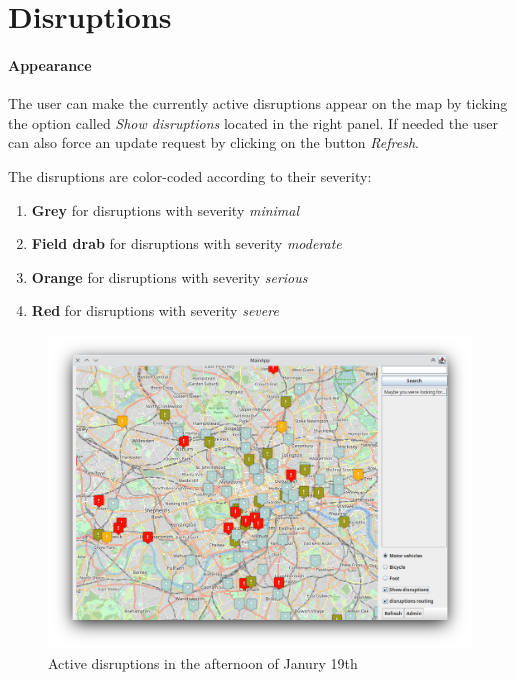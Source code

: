 \section{Disruptions}

\paragraph{Appearance}
The user can make the currently active disruptions appear on the map by ticking 
the option called \textit{Show disruptions} located in the right panel. If 
needed the user can also force an update request by clicking on the button 
\textit{Refresh}.

The disruptions are color-coded according to their severity:

\begin{enumerate}
	\item \textbf{Grey} for disruptions with severity \textit{minimal}
	\item \textbf{Field drab} for disruptions with severity \textit{moderate}
	\item \textbf{Orange} for disruptions with severity \textit{serious}
	\item \textbf{Red} for disruptions with severity \textit{severe}
\end{enumerate}

\begin{figure}[H]
	\centering
	\includegraphics[width=\linewidth]{assets/mainapp2}
	\caption{Active disruptions in the afternoon of Janury 19th}
	\label{fig:mainapp2}
\end{figure}

